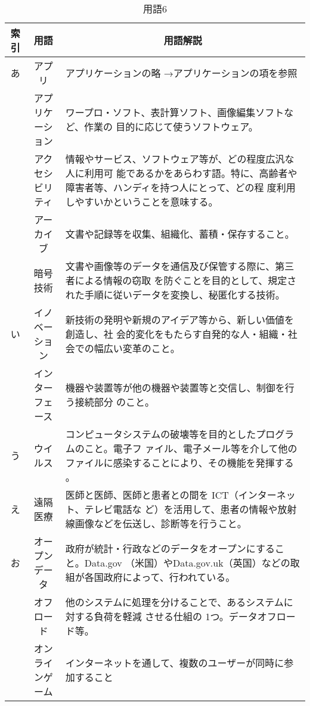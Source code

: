 \begin{table}[htb]
  \begin{center}
    \caption{用語6}
    \begin{tabular}{|c|c|p{10cm}|}
      \hline
      索引 & 用語 & \multicolumn{1}{c|}{用語解説} \\
      \hline
      あ & アプリ & アプリケーションの略
      →アプリケーションの項を参照 \\
      \cline{2-3}
      & アプリケーション & ワープロ・ソフト、表計算ソフト、画像編集ソフトなど、作業の
      目的に応じて使うソフトウェア。 \\
      \cline{2-3}
      & アクセシビリティ & 情報やサービス、ソフトウェア等が、どの程度広汎な人に利用可
      能であるかをあらわす語。特に、高齢者や障害者等、ハンディを持つ人にとって、どの程
      度利用しやすいかということを意味する。 \\
      \cline{2-3}
      & アーカイブ & 文書や記録等を収集、組織化、蓄積・保存すること。 \\
      \cline{2-3}
      & 暗号技術 & 文書や画像等のデータを通信及び保管する際に、第三者による情報の窃取
      を防ぐことを目的として、規定された手順に従いデータを変換し、秘匿化する技術。 \\
      \hline
      い & イノベーション & 新技術の発明や新規のアイデア等から、新しい価値を創造し、社
      会的変化をもたらす自発的な人・組織・社会での幅広い変革のこと。\\
      \cline{2-3}
      & インターフェース & 機器や装置等が他の機器や装置等と交信し、制御を行う接続部分
      のこと。 \\
      \hline
      う & ウイルス & コンピュータシステムの破壊等を目的としたプログラムのこと。電子フ
      ァイル、電子メール等を介して他のファイルに感染することにより、その機能を発揮する
      。 \\
      \hline
      え & 遠隔医療 & 医師と医師、医師と患者との間を ICT（インターネット、テレビ電話な
        ど）を活用して、患者の情報や放射線画像などを伝送し、診断等を行うこと。 \\
      \hline
      お & オープンデータ & 政府が統計・行政などのデータをオープンにすること。Data.gov
      （米国）やData.gov.uk（英国）などの取組が各国政府によって、行われている。 \\
      \cline{2-3}
      & オフロード & 他のシステムに処理を分けることで、あるシステムに対する負荷を軽減
      させる仕組の 1つ。データオフロード等。 \\
      \cline{2-3}
      & オンラインゲーム & インターネットを通して、複数のユーザーが同時に参加すること

\end{tabular}
\end{center}
\end{table}

